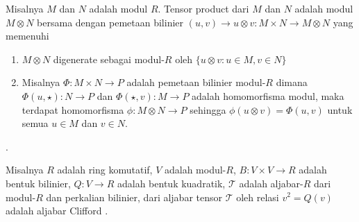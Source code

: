 \begin{defn}
Misalnya $M$ dan $N$ adalah modul $R$. Tensor product dari $M$ dan $N$ adalah modul ${M \otimes N}$ bersama dengan pemetaan bilinier ${(u,v) \to u \otimes v : M \times N \to M \otimes N}$ yang memenuhi
\begin{enumerate}
	\item ${M \otimes N}$ digenerate sebagai modul-$R$ oleh ${\{u \otimes v : u \in M, v \in N\}}$
	\item Misalnya ${\Phi: M \times N \to P}$ adalah pemetaan bilinier modul-$R$ dimana ${\Phi(u,\star): N \to P}$ dan ${\Phi(\star,v): M \to P}$ adalah homomorfisma modul, maka terdapat homomorfisma ${\phi: M \otimes N \to P}$ sehingga ${\phi(u \otimes v) = \Phi(u, v)}$ untuk semua ${u \in M}$ dan ${v \in N}$.
\end{enumerate}
\citep{Pierce1982}.
\end{defn}

\begin{defn}
Misalnya $R$ adalah ring komutatif, $V$ adalah modul-$R$, ${B: V \times V \to R}$ adalah bentuk bilinier, ${Q: V \to R}$ adalah bentuk kuadratik, $\mathcal{T}$ adalah aljabar-$R$ dari modul-$R$ dan perkalian bilinier,  dari aljabar tensor $\mathcal{T}$ oleh relasi  ${v^2 = Q(v)}$ adalah aljabar Clifford \citep{Wieser2024}.
\end{defn}
